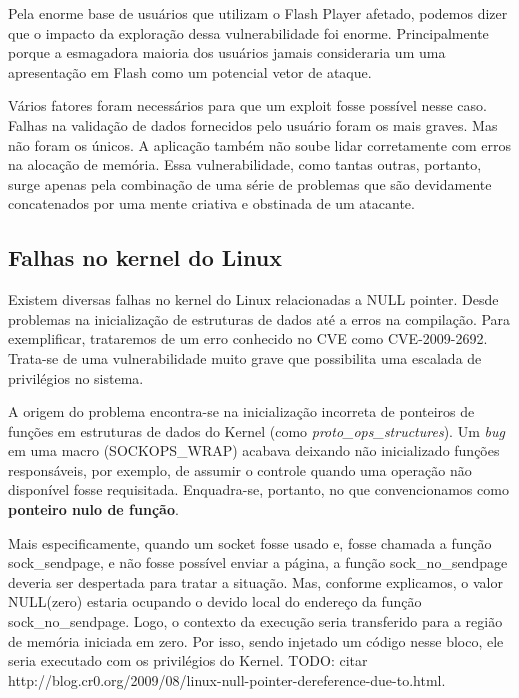 			
			Pela enorme base de usuários que utilizam o Flash Player afetado, podemos dizer
			que o impacto da exploração dessa vulnerabilidade foi enorme.
			Principalmente porque a esmagadora maioria dos usuários jamais consideraria um
			uma apresentação em Flash como um potencial vetor de ataque.

			
			Vários fatores foram necessários para que um exploit fosse possível nesse caso.
			Falhas na validação de dados fornecidos pelo usuário foram os mais graves.
			Mas não foram os únicos. A aplicação também não soube lidar corretamente com erros
			na alocação de memória. Essa vulnerabilidade, como tantas outras, portanto, surge
			apenas pela combinação de uma série de problemas que são devidamente concatenados
			por uma mente criativa e obstinada de um atacante.
						
		
		\subsection{Falhas no kernel do Linux}
			Existem diversas falhas no kernel do Linux relacionadas a NULL pointer.
			Desde problemas na inicialização de estruturas de dados até a erros na compilação.		
			Para exemplificar, trataremos de um erro conhecido no CVE como CVE-2009-2692.
			Trata-se de uma vulnerabilidade muito grave que possibilita uma escalada de privilégios
			no sistema.
			
			
			A origem do problema encontra-se na inicialização incorreta de ponteiros de funções em estruturas
			de dados do Kernel (como \textsl{proto\_ops\_structures}). 
			Um \textsl{bug} em uma macro (SOCKOPS\_WRAP) acabava deixando não inicializado
			funções responsáveis, por exemplo, de assumir o controle quando uma operação não disponível fosse
			requisitada. Enquadra-se, portanto, no que convencionamos como \textbf{ponteiro nulo de função}.

			
			Mais especificamente, quando um socket fosse usado e, fosse chamada a função sock\_sendpage,
			e não fosse possível enviar a página, a função sock\_no\_sendpage deveria ser despertada
			para tratar a situação. Mas, conforme explicamos, o valor NULL(zero) estaria ocupando o devido
			local do endereço da função sock\_no\_sendpage. Logo, o contexto da execução seria transferido
			para a região de memória iniciada em zero. Por isso, sendo injetado um código nesse bloco,
			ele seria executado com os privilégios do Kernel.
			TODO: citar http://blog.cr0.org/2009/08/linux-null-pointer-dereference-due-to.html.

